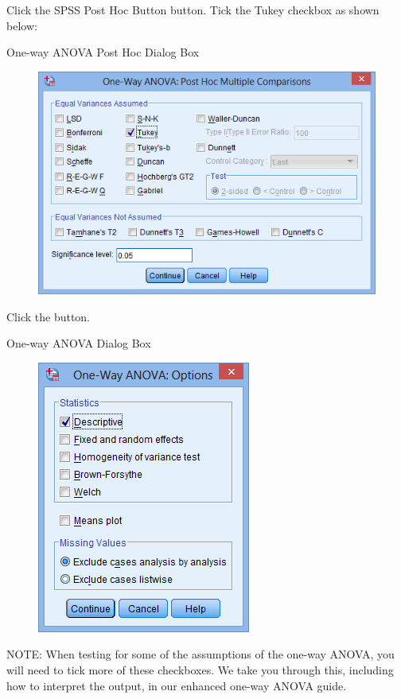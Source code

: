 \documentclass[]{article}
\begin{document}
Click the SPSS Post Hoc Button button. Tick the Tukey checkbox as shown below:

One-way ANOVA  Post Hoc Dialog Box
\begin{figure}
\centering
\includegraphics[width=0.7\linewidth]{images/one-way-anova-4}
\caption{}
\label{fig:one-way-anova-4}
\end{figure}

Click the  button.


One-way ANOVA Dialog Box
\begin{figure}
\centering
\includegraphics[width=0.7\linewidth]{images/one-way-anova-5}
\caption{}
\label{fig:one-way-anova-5}
\end{figure}

NOTE: When testing for some of the assumptions of the one-way ANOVA, you will need to tick more of these checkboxes. We take you through this, including how to interpret the output, in our enhanced one-way ANOVA guide.
\end{document}
